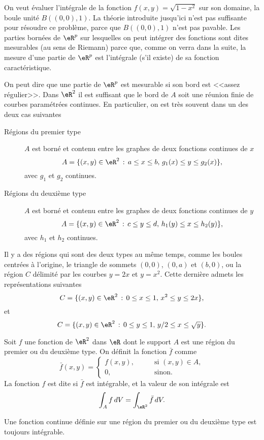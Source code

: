 On veut évaluer l'intégrale de la fonction $f(x,y)=\sqrt{1-x^2}$ sur son domaine, la boule unité $B((0,0),1)$. La théorie introduite jusqu'ici n'est pas suffisante pour résoudre  ce problème, parce que $B((0,0),1)$ n'est pas pavable. Les parties bornées de $\eR^p$ sur lesquelles on peut intégrer des fonctions sont dites mesurables (au sens de Riemann) parce que, comme on verra dans la suite, la mesure d'une partie de $\eR^p$ est l'intégrale (s'il existe) de sa fonction caractéristique.

On peut dire que une partie de $\eR^p$  est mesurable si son bord est <<assez régulier>>. Dans $\eR^2$ il est suffisant que le bord de $A$ soit une réunion finie de courbes paramétrées continues. En particulier, on est très souvent dans un des deux cas suivantes
\begin{description}
\item[Régions du premier type] $A$ est borné et contenu entre les graphes de deux fonctions continues de $x$
\[
A=\{(x,y)\in\eR^2 \,:\, a\leq x\leq b, \, g_1(x)\leq y\leq g_2(x)\},
\]
avec $g_1$ et $g_2$ continues.
\item[Régions du deuxième type] $A$ est borné et contenu entre les graphes de deux fonctions continues de $y$
\[
A=\{(x,y)\in\eR^2 \,:\, c\leq y\leq d, \, h_1(y)\leq x\leq h_2(y)\},
\]
avec $h_1$ et $h_2$ continues.
\end{description}
\newcommand{\CaptionFigRegioniPrimoeSecondoTipo}{Régions du premier et du deuxième type}


\begin{example}
 Il y a des régions qui sont des deux types au même temps, comme les boules centrées à l'origine, le triangle de sommets  $(0,0)$, $(0,a)$ et $(b,0)$, ou la région $C$ délimité par les courbes $y=2x$ et $y=x^2$. Cette dernière admets les représentations suivantes
\[
C= \{(x,y)\in\eR^2 \,:\, 0\leq x\leq 1, \, x^2\leq y\leq 2x\},
\]
et
\[
C= \{(x,y)\in\eR^2 \,:\, 0\leq y\leq 1, \, y/2\leq x\leq \sqrt{y}\}.
\]
\end{example}
\begin{definition}
  Soit $f$ une fonction de $\eR^2$ dans $\eR$ dont le support  $A$ est une région du premier ou du deuxième type. On définit la fonction $\bar f$ comme
 \begin{equation}
 \bar f(x,y) = \left\{ \begin{array}{ll}
     f(x,y), \qquad & \textrm{si } (x,y)\in A,\\
  0 , & \textrm{sinon.}
    \end{array}\right.
  \end{equation}
  La fonction $f$ est dite  si $\bar f$ est intégrable, et la valeur de son intégrale est
\[
\int_A f\, dV=\int_{\eR^2} \bar f\, dV.
\]
\end{definition}
Une fonction continue définie sur une région du premier ou du deuxième type est toujours intégrable.

